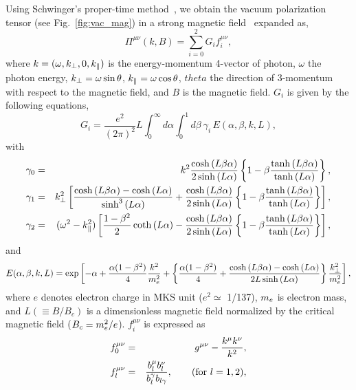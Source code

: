 Using Schwinger's proper-time method~\cite{schwinger}, we obtain the
vacuum polarization tensor (see Fig.~\ref{fig:vac_mag}) in a strong
magnetic field~\cite{melrose_stoneham} expanded as,
\begin{equation}
    \label{eq:polarization_tensor}
    \Pi^{\mu\nu}(k, B) = \sum_{i = 0}^2 G_i f_i^{\mu\nu},
\end{equation}
where $k = (\omega, k_{\perp}, 0, k_{\parallel})$ is the energy-momentum
4-vector of photon, $\omega$ the photon energy, $k_{\perp} =
\omega\sin\theta$, $k_{\parallel} = \omega\cos\theta$, $theta$ the direction 
of 3-momentum with respect to the magnetic field, and $B$ is the
magnetic field. $G_i$ is given by the following equations,
\begin{equation}
    \label{eq:gi}
    G_i = \frac{e^2}{(2\pi)^2}L\int^{\infty}_0 \!\! d\alpha \int^1_0 
    \! d\beta \  
    \gamma_i \, E(\alpha, \beta, k, L),
\end{equation}
with
\begin{eqnarray}
    \label{eq:gamma_i}
    \gamma_0 &=& k^2\frac{\cosh{(L\beta\alpha)}}{2\sinh{(L\alpha)}}
    \left\{1-\beta\frac{\tanh{(L\beta\alpha)}}{\tanh{(L\alpha)}}\right\},
    \\
    \gamma_1 &=& k_{\perp}^2 \left[
      \frac{\cosh{(L\beta\alpha)}-\cosh{(L\alpha)}}{\sinh^3{(L\alpha)}}
      + \frac{\cosh{(L\beta\alpha)}}{2\sinh{(L\alpha)}}
      \left\{1-\beta\frac{\tanh{(L\beta\alpha)}}{\tanh{(L\alpha)}}
      \right\}\right],
    \\
    \gamma_2 &=& (\omega^2-k_{\parallel}^2)\left
    [ \frac{1-\beta^2}2\coth{(L\alpha) - \frac{\cosh{(L\beta\alpha)}}
    {2\sinh{(L\alpha)}}
    \left\{1-\beta\frac{\tanh{(L\beta\alpha)}}
     {\tanh{(L\alpha)}}\right\}}\right],
\end{eqnarray}
and
\begin{equation}
    \label{eq:expfac}
    E(\alpha, \beta, k, L) =
    \exp\left[-\alpha+\frac{\alpha(1-\beta^2)}{4} \frac{k^2}{m_e^2} +
      \left\{ \frac{\alpha(1-\beta^2)}{4}
        +\frac{\cosh{(L\beta\alpha)}-\cosh{(L\alpha)}}{2L\sinh{(L\alpha)}}
      \right\} \frac{k_{\perp}^2}{m_e^2}\right],
\end{equation}
where $e$ denotes electron charge in MKS unit ($e^2 \simeq$ 1/137),
$m_e$ is electron mass, and $L (\equiv B/B_c)$ is a dimensionless
magnetic field normalized by the critical magnetic field ($B_c =
m_e^2/e$). $f_i^{\mu\nu}$ is expressed as
\begin{eqnarray}
    \label{eq:f_0}
    f_0^{\mu\nu} &=& g^{\mu\nu} - \frac{k^{\mu}k^{\nu}}{k^2}, \\
    \label{eq:f_12}
    f_l^{\mu\nu} &=&
    \frac{b_l^{\mu}b_l^{\nu}}{b_l^{\gamma}b_{l\gamma}},
    \qquad ({\rm for} \ l = 1,2),
\end{eqnarray}
